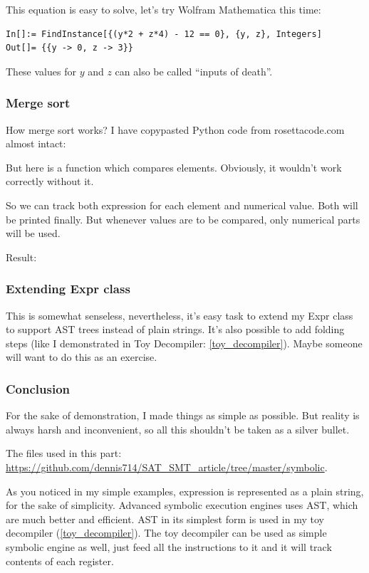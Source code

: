 This equation is easy to solve, let's try Wolfram Mathematica this time:

\begin{lstlisting}
In[]:= FindInstance[{(y*2 + z*4) - 12 == 0}, {y, z}, Integers]
Out[]= {{y -> 0, z -> 3}}
\end{lstlisting}

These values for $y$ and $z$ can also be called ``inputs of death''.

\subsubsection{Merge sort}

How merge sort works?
I have copypasted Python code from rosettacode.com almost intact:



But here is a function which compares elements.
Obviously, it wouldn't work correctly without it.

So we can track both expression for each element and numerical value.
Both will be printed finally.
But whenever values are to be compared, only numerical parts will be used.

Result:



\subsubsection{Extending Expr class}

This is somewhat senseless, nevertheless, it's easy task to extend my Expr class to support AST trees instead of
plain strings.
It's also possible to add folding steps (like I demonstrated in Toy Decompiler: \ref{toy_decompiler}).
Maybe someone will want to do this as an exercise.

\subsubsection{Conclusion}

For the sake of demonstration, I made things as simple as possible.
But reality is always harsh and inconvenient, so all this shouldn't be taken as a silver bullet.

The files used in this part: \url{https://github.com/dennis714/SAT_SMT_article/tree/master/symbolic}.

As you noticed in my simple examples, expression is represented as a plain string, for the sake of simplicity.
Advanced symbolic execution engines uses \ac{AST}, which are much better and efficient.
\ac{AST} in its simplest form is used in my toy decompiler (\ref{toy_decompiler}).
The toy decompiler can be used as simple symbolic engine as well, just feed all the instructions to it and it will track contents of each register.

